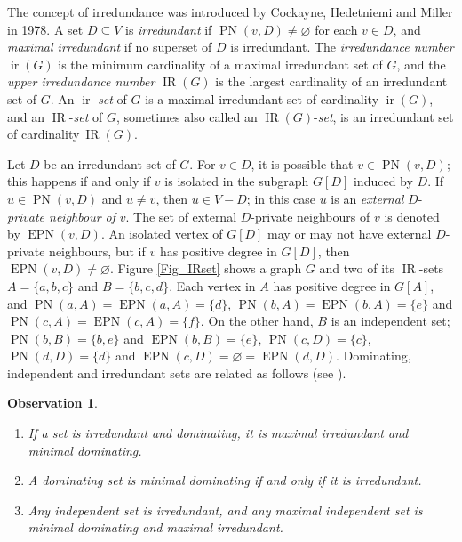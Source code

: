\documentclass[12pt]{article}%
\newtheorem{observation}[theorem]{Observation}
\begin{document}
The concept of irredundance was introduced by Cockayne, Hedetniemi and Miller
\cite{CHM} in 1978. A set $D\subseteq V$ is \emph{irredundant }if
$\operatorname{PN}(v,D)\neq\varnothing$ for each $v\in D$, and \emph{maximal
irredundant} if no superset of $D$ is irredundant. The \emph{irredundance
number }$\operatorname{ir}(G)$ is the minimum cardinality of a maximal
irredundant set of $G$, and the \emph{upper irredundance number }%
$\operatorname{IR}(G)$ is the largest cardinality of an irredundant set of
$G$. An $\operatorname{ir}$-\emph{set} of $G$ is a maximal irredundant set of
cardinality $\operatorname{ir}(G)$, and an $\operatorname{IR}$-\emph{set} of
$G$, sometimes also called an $\operatorname{IR}(G)$-\emph{set}, is an
irredundant set of cardinality$~\operatorname{IR}(G)$.

Let $D$ be an irredundant set of $G$. For $v\in D$, it is possible that
$v\in\operatorname{PN}(v,D)$; this happens if and only if $v$ is isolated in
the subgraph $G[D]$ induced by $D$. If $u\in\operatorname{PN}(v,D)$ and $u\neq
v$, then $u\in V-D$; in this case $u$ is an \emph{external }$D$-\emph{private
neighbour of }$v$. The set of external $D$-private neighbours of $v$ is
denoted by $\operatorname{EPN}(v,D)$. An isolated vertex of $G[D]$ may or may
not have external $D$-private neighbours, but if $v$ has positive degree in
$G[D]$, then $\operatorname{EPN}(v,D)\neq\varnothing$. Figure \ref{Fig_IRset}
shows a graph $G$ and two of its $\operatorname{IR}$-sets $A=\{a,b,c\}$ and
$B=\{b,c,d\}$. Each vertex in $A$ has positive degree in $G[A]$, and
$\operatorname{PN}(a,A)=\operatorname{EPN}(a,A)=\{d\}$, $\operatorname{PN}%
(b,A)=\operatorname{EPN}(b,A)=\{e\}$ and $\operatorname{PN}%
(c,A)=\operatorname{EPN}(c,A)=\{f\}$. On the other hand, $B$ is an independent
set; $\operatorname{PN}(b,B)=\{b,e\}$ and $\operatorname{EPN}(b,B)=\{e\}$,
$\operatorname{PN}(c,D)=\{c\}$, $\operatorname{PN}(d,D)=\{d\}$ and
$\operatorname{EPN}(c,D)=\varnothing=\operatorname{EPN}(d,D)$. Dominating,
independent and irredundant sets are related as follows (see
\cite[Propositions 3.8 and 3.9]{HHS}).

\begin{observation}
\label{Ob_irr_dom}

\begin{enumerate}
\item[$(i)$] If a set is irredundant and dominating, it is maximal irredundant
and minimal dominating.

\item[$(ii)$] A dominating set is minimal dominating if and only if it is irredundant.

\item[$(iii)$] Any independent set is irredundant, and any maximal independent
set is minimal dominating and maximal irredundant.
\end{enumerate}
\end{observation}
\end{document}
